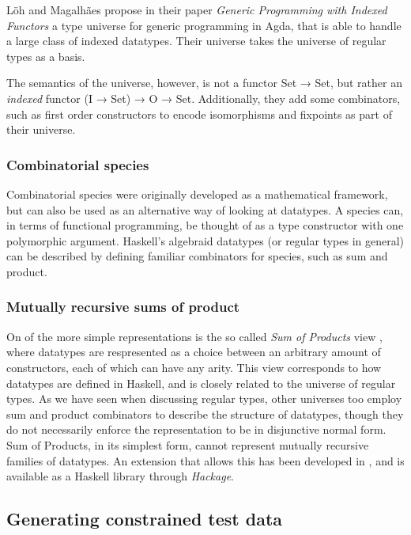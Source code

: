 \documentclass[a4paper,msc,twosized=semi]{uustthesis}
\let\oldemph\emph
\renewcommand\emph[1]{{\large\oldemph{#1}}}
\newcommand{\agda}[1]{{\agdafontinline\color{agdacolor}#1}}
\begin{document}
  Löh and Magalhães propose in their paper \emph{Generic Programming with Indexed 
  Functors} \cite{loh2011generic} a type universe for generic programming in Agda, 
  that is able to handle a large class of indexed datatypes. Their universe takes the 
  universe of regular types as a basis. 
  
  The semantics of the universe, however, is not a functor \agda{Set → Set}, but rather an 
  \emph{indexed} functor \agda{(I → Set) → O → Set}. Additionally, they add some 
  combinators, such as first order constructors to encode isomorphisms and fixpoints 
  as part of their universe. 

\subsubsection{Combinatorial species}

  Combinatorial species \cite{yorgey2010species} were 
  originally developed as a mathematical framework, but can also be used as an 
  alternative way of looking at datatypes. A species can, in terms of functional 
  programming, be thought of as a type constructor with one polymorphic argument. 
  Haskell’s algebraid datatypes (or regular types in general) can be described by defining familiar 
  combinators for species, such as sum and product.

\subsubsection{Mutually recursive sums of product}

  On of the more simple representations is the so called \textit{Sum of Products} view 
  \cite{de2014true}, where datatypes are respresented as a choice between an arbitrary 
  amount of constructors, each of which can have any arity. This view corresponds to 
  how datatypes are defined in Haskell, and is closely related to the universe of 
  regular types. As we have seen when discussing regular types, other 
  universes too employ sum and product combinators to describe the structure of 
  datatypes, though they do not necessarily enforce the representation to be in 
  disjunctive normal form. Sum of Products, in its simplest form, cannot represent 
  mutually recursive families of datatypes. An extension that allows this has been 
  developed in \cite{miraldo2018sums}, and is available as a Haskell library through 
  \emph{Hackage}.  

\subsection{Generating constrained test data}
\end{document}
